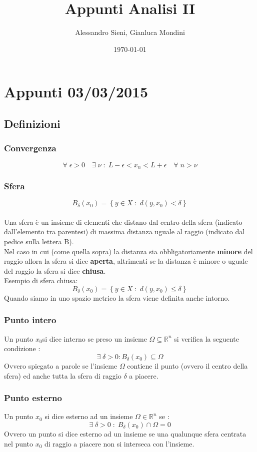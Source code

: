 \documentclass[fontsize = 20px, paper = a4]{article}
\author{Alessandro Sieni, Gianluca Mondini}
\title{Appunti Analisi II }
\date{\today}
\begin{document}
\maketitle
\newpage
\tableofcontents
\newpage
\section{Appunti 03/03/2015}
\subsection{Definizioni}
\subsubsection{Convergenza}
\hspace*{1cm}
$$\forall \; \epsilon > 0 \quad \exists \; \nu \; : \; L-\epsilon<x_n<L+\epsilon \quad \forall \; n > \nu$$ 
\subsubsection{Sfera}
\hspace*{1cm}
$$B_\delta(x_0) = \left \{ y \in X \; : \; d(y,x_0) < \delta \right\}$$ \\
Una sfera è un insieme di elementi che distano dal centro della sfera (indicato dall'elemento tra parentesi) di massima distanza uguale al raggio (indicato dal pedice sulla lettera B).\\
Nel caso in cui (come quella sopra) la distanza sia obbligatoriamente \textbf{minore} del raggio allora la sfera si dice \textbf{aperta}, altrimenti se la distanza è minore o uguale del raggio la sfera si dice \textbf{chiusa}. \\
Esempio di sfera chiusa:
$$B_\delta(x_0) = \left \{ y \in X \; : \; d(y,x_0) \le \delta \right\}$$ 
Quando siamo in uno spazio metrico la sfera viene definita anche intorno.
\subsubsection{Punto intero}
Un punto $x_0$si dice interno se preso un insieme $\Omega \subseteq \mathbb{R}^n$ si verifica la seguente condizione : 
$$\exists \; \delta > 0 : B_\delta (x_0) \subseteq \Omega$$
Ovvero spiegato a parole se l'insieme $\Omega$ contiene il punto (ovvero il centro della sfera) ed anche tutta la sfera di raggio $\delta$ a piacere.
\subsubsection{Punto esterno}
Un punto $x_0$ si dice esterno ad un insieme $\Omega \in \mathbb{R}^n$ se :
$$\exists \; \delta > 0 \; : \; B_\delta (x_0) \cap \Omega = 0$$
Ovvero un punto si dice esterno ad un insieme se una qualunque sfera centrata nel punto $x_0$ di raggio a piacere non si interseca con l'insieme.
\end{document}
